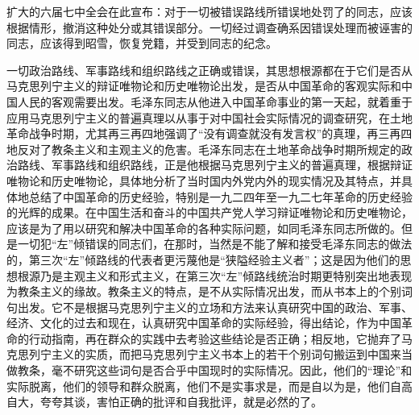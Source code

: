 扩大的六届七中全会在此宣布：对于一切被错误路线所错误地处罚了的同志，应该根据情形，撤消这种处分或其错误部分。一切经过调查确系因错误处理而被诬害的同志，应该得到昭雪，恢复党籍，并受到同志的纪念。


一切政治路线、军事路线和组织路线之正确或错误，其思想根源都在于它们是否从马克思列宁主义的辩证唯物论和历史唯物论出发，是否从中国革命的客观实际和中国人民的客观需要出发。毛泽东同志从他进入中国革命事业的第一天起，就着重于应用马克思列宁主义的普遍真理以从事于对中国社会实际情况的调查研究，在土地革命战争时期，尤其再三再四地强调了“没有调查就没有发言权”的真理，再三再四地反对了教条主义和主观主义的危害。毛泽东同志在土地革命战争时期所规定的政治路线、军事路线和组织路线，正是他根据马克思列宁主义的普遍真理，根据辩证唯物论和历史唯物论，具体地分析了当时国内外党内外的现实情况及其特点，并具体地总结了中国革命的历史经验，特别是一九二四年至一九二七年革命的历史经验的光辉的成果。在中国生活和奋斗的中国共产党人学习辩证唯物论和历史唯物论，应该是为了用以研究和解决中国革命的各种实际问题，如同毛泽东同志所做的。但是一切犯“左”倾错误的同志们，在那时，当然是不能了解和接受毛泽东同志的做法的，第三次“左”倾路线的代表者更污蔑他是“狭隘经验主义者”；这是因为他们的思想根源乃是主观主义和形式主义，在第三次“左”倾路线统治时期更特别突出地表现为教条主义的缘故。教条主义的特点，是不从实际情况出发，而从书本上的个别词句出发。它不是根据马克思列宁主义的立场和方法来认真研究中国的政治、军事、经济、文化的过去和现在，认真研究中国革命的实际经验，得出结论，作为中国革命的行动指南，再在群众的实践中去考验这些结论是否正确；相反地，它抛弃了马克思列宁主义的实质，而把马克思列宁主义书本上的若干个别词句搬运到中国来当做教条，毫不研究这些词句是否合乎中国现时的实际情况。因此，他们的“理论”和实际脱离，他们的领导和群众脱离，他们不是实事求是，而是自以为是，他们自高自大，夸夸其谈，害怕正确的批评和自我批评，就是必然的了。

